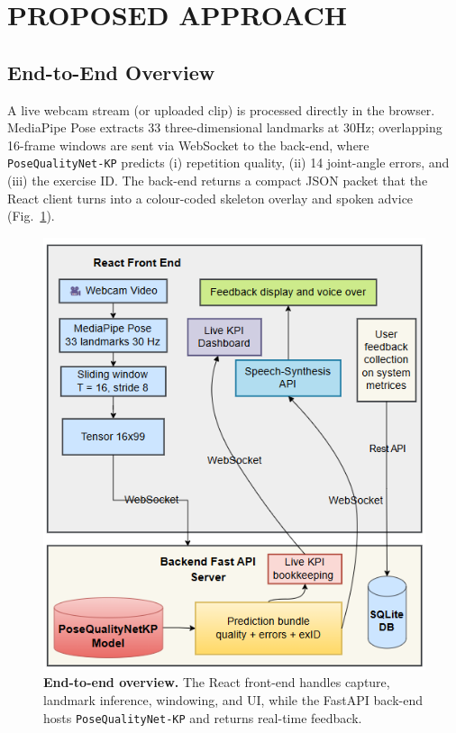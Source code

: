 \documentclass{article}
\begin{document}
\FloatBarrier

\section{PROPOSED APPROACH}
\label{sec:system}

\subsection{End-to-End Overview}
A live webcam stream (or uploaded clip) is processed directly in the browser.  MediaPipe Pose extracts 33 three-dimensional landmarks at 30Hz; overlapping 16-frame windows are sent via WebSocket to the back-end, where \texttt{PoseQualityNet-KP} predicts (i) repetition quality, (ii) 14 joint-angle errors, and (iii) the exercise ID.  The back-end returns a compact JSON packet that the React client turns into a colour-coded skeleton overlay and spoken advice (Fig.~\ref{fig:overview}).

\begin{figure}[!htbp] 
  \centering
  \includegraphics[width=\linewidth]{figs/inference_architecture.png}
  \caption{\textbf{End-to-end overview.}  The React front-end handles
           capture, landmark inference, windowing, and UI, while the
           FastAPI back-end hosts \texttt{PoseQualityNet-KP} and
           returns real-time feedback.}
  \label{fig:overview}
\end{figure}
\end{document}
